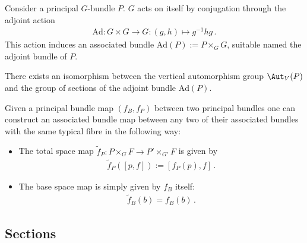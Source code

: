     \begin{example}
        Consider a principal $G$-bundle $P$. $G$ acts on itself by conjugation through the adjoint action
        \begin{gather}
            \mathrm{Ad}:G\times G\rightarrow G:(g,h)\mapsto g^{-1}hg\,.
        \end{gather}
        This action induces an associated bundle $\mathrm{Ad}(P):=P\times_GG$, suitable named the adjoint bundle of $P$.
    \end{example}
    \begin{property}
        There exists an isomorphism between the vertical automorphism group $\Aut_V(P)$ and the group of sections of the adjoint bundle $\mathrm{Ad}(P)$.
    \end{property}

    \begin{construct}
        Given a principal bundle map $(f_B,f_P)$ between two principal bundles one can construct an associated bundle map between any two of their associated bundles with the same typical fibre in the following way:
        \begin{itemize}
            \item The total space map $\widetilde{f}_P:P\times_GF\rightarrow P'\times_{G'}F$ is given by
                \begin{gather}
                    \widetilde{f}_P([p,f]) := [f_P(p),f]\,.
                \end{gather}
            \item The base space map is simply given by $f_B$ itself:
                \begin{gather}
                    \widetilde{f}_B(b) = f_B(b)\,.
                \end{gather}
        \end{itemize}
    \end{construct}

\subsection{Sections}

